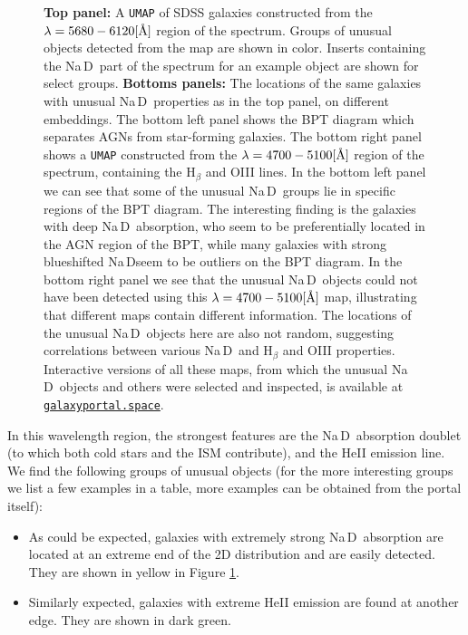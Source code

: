 \documentclass[fleqn,usenatbib]{mnras}
\newcommand{\angstrom}{\mbox{\normalfont\AA}}
\newcommand{\gtoast}{\href{https://galaxyportal.space/}{\texttt{galaxyportal.space}}}
\def\nad{\mbox{Na\hspace{.5pt}{I}\,D}}
\begin{document}
{\begin{figure}
\caption{\textbf{Top panel:} A \texttt{UMAP} of SDSS galaxies constructed from the $\lambda = 5680 - 6120 [\angstrom]$ region of the spectrum. Groups of unusual objects detected from the map are shown in color. Inserts containing the \nad\ part of the spectrum for an example object are shown for select groups. \textbf{Bottoms panels:} The locations of the same galaxies with unusual \nad\ properties as in the top panel, on different embeddings. The bottom left panel shows the BPT diagram which separates AGNs from star-forming galaxies. The bottom right panel shows a \texttt{UMAP}  constructed from the $\lambda = 4700 - 5100 [\angstrom]$ region of the spectrum, containing the H$_{\beta}$ and OIII lines.  In the bottom left panel we can see that some of the unusual \nad\ groups lie in specific regions of the BPT diagram. The interesting finding is the galaxies with deep \nad\ absorption, who seem to be preferentially located in the AGN region of the BPT, while many galaxies with strong blueshifted \nad seem to be outliers on the BPT diagram.  In the bottom right panel we see that the unusual \nad\ objects could not have been detected using this $\lambda = 4700 - 5100 [\angstrom]$ map, illustrating that different maps contain different information. The locations of the unusual \nad\ objects here are also not random, suggesting correlations between various \nad\ and H$_{\beta}$ and OIII properties.
 Interactive versions of all these maps, from which the unusual \nad\ objects and others  were selected and inspected, is available at \gtoast.} \label{fig:outs_umap}
\end{figure}





In this wavelength region, the strongest features are the \nad\ absorption doublet (to which both  cold stars and the ISM contribute), and the HeII emission line. We find the following groups of unusual objects (for the more interesting groups we list a few examples in a table, more examples can be obtained from the portal itself):

\begin{itemize}
\item As could be expected, galaxies with extremely strong \nad\ absorption are located at an extreme end of the 2D distribution and are easily detected. They are shown in yellow in Figure \ref{fig:outs_umap}. 

\item Similarly expected, galaxies with extreme HeII emission are found at another  edge. They are shown in dark green. 


\end{itemize}}
\end{document}
